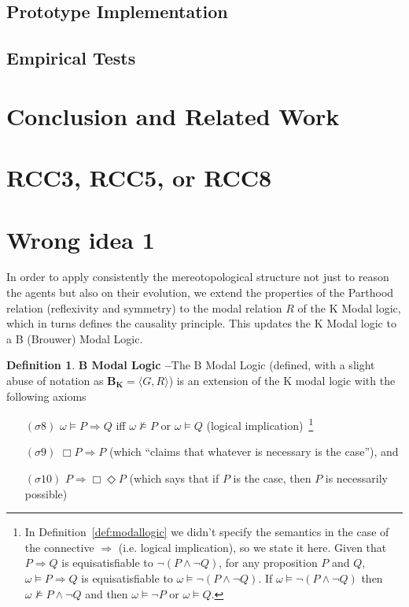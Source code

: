 \documentclass{article}
\theoremstyle{definition}
\newtheorem{definition}{Definition}[section]
\theoremstyle{corollary}
\theoremstyle{lemma}
\theoremstyle{theorem}
\theoremstyle{theorem}
\newcommand{\bframe}{\mathbf{B_K}}
\newcommand{\possibleworlds}{G}
\newcommand{\modalrelation}{R}
\newcommand{\world}{\omega}
\newcommand{\interpretation}{\sigma}
\begin{document}
\subsection{Prototype Implementation}\label{sec:implementation}
\subsection{Empirical Tests}\label{sec:tests}

\section{Conclusion and Related Work}\label{sec:related}

\printbibliography

\begin{appendices}
	\section{RCC3, RCC5, or RCC8}\label{app:rcc}
	\section{Wrong idea 1}
In order to apply consistently the mereotopological structure not just to
reason the agents but also on their evolution, we extend the properties of the
Parthood relation (reflexivity and symmetry) to the modal relation
$\modalrelation$ of the K Modal logic, which in turns defines the causality
principle. This updates the K Modal logic to a B (Brouwer) Modal Logic\autocite{Garson2018modal}.

\begin{definition}{\bf B Modal Logic --}\label{thm:bk-parthood}
	The B Modal Logic (defined, with a slight abuse of notation as
	$\bframe=\langle\possibleworlds,\modalrelation\rangle$) is an extension
	of the K modal logic with the following axioms
	\begin{enumerate}[noitemsep]
		\item[$(\interpretation8)$] $\world\models P\Rightarrow Q$ iff
			$\world\not\models P$ or $\world\models Q$ (logical implication)~\footnote{In
			Definition~\ref{def:modallogic} we didn't specify the
			semantics in the case of the connective $\Rightarrow$
			(i.e. logical implication), so we state it here. Given
			that $P\Rightarrow Q$ is equisatisfiable to
			$\neg(P\wedge \neg Q)$, for any proposition $P$ and
			$Q$, $\world\models P\Rightarrow Q$ is equisatisfiable
			to $\world\models \neg(P\wedge \neg Q)$. If
			$\world\models \neg(P\wedge \neg Q)$ then
			$\world\not\models P\wedge\neg Q$ and then
			$\world\models \neg P$ or $\world\models Q$.}
		\item[$(\interpretation9)$] $\Box P\Rightarrow P$ (which ``claims that whatever is necessary is the case''\autocite{Garson2018modal}), and
		\item[$(\interpretation10)$] $P\Rightarrow\Box\Diamond P$
			(which says that if $P$ is the case, then $P$ is
			necessarily possible\autocite{Garson2018modal})
	\end{enumerate}
\end{definition}


\end{appendices}
\end{document}
